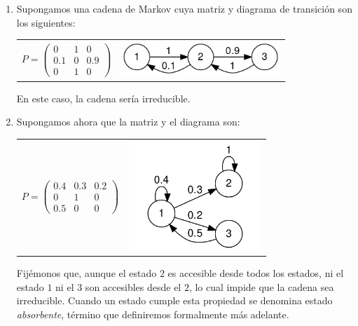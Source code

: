 \begin{ejemplo}
    \begin{enumerate}
        \item Supongamos una cadena de Markov cuya matriz y diagrama de transición son los siguientes:
        \begin{table}[h]
            \centering
            \begin{tabular}{cc}
            $P = \begin{pmatrix}
                0 & 1 & 0 \\
                0.1 & 0 & 0.9 \\
                0 & 1 & 0
            \end{pmatrix}
            $ & \includegraphics[width=6cm]{img/C3/ejemplo_diagrama_1.png}
        \end{tabular}
        \end{table}

        En este caso, la cadena sería irreducible.
        \item Supongamos ahora que la matriz y el diagrama son:
        \begin{table}[h]
            \centering
            \begin{tabular}{cc}
            $P = \begin{pmatrix}
                0.4 & 0.3 & 0.2 \\
                0 & 1 & 0 \\
                0.5 & 0 & 0
            \end{pmatrix}
            $ & \includegraphics[width=5cm]{img/C3/ejemplo_diagrama_2.png}
        \end{tabular}
        \end{table}


        Fijémonos que, aunque el estado $2$ es accesible desde todos los estados, ni el estado $1$ ni el $3$ son accesibles desde el $2$, lo cual impide que la cadena sea irreducible. Cuando un estado cumple esta propiedad se denomina estado \textit{absorbente}, término que definiremos formalmente más adelante.
    \end{enumerate}
\end{ejemplo}


